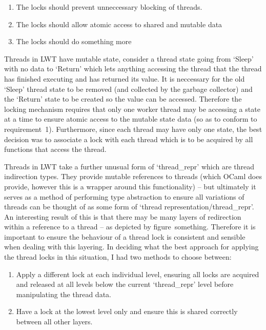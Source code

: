 \documentclass[12pt,twoside,notitlepage]{report}
\begin{document}
\begin{enumerate}
\item The locks should prevent unneccessary blocking of threads.
\item The locks should allow atomic access to shared and mutable data
\item The locks should do something more
\end{enumerate}
%
%
Threads in LWT have mutable state, consider a thread state going from `Sleep' with no data to `Return' which lets anything accessing the thread that the thread has finished executing and has returned its value. It is neccessary for
the old `Sleep' thread state to be removed (and collected by the garbage collector) and the `Return' state to be created so the value can be accessed. Therefore the locking mechanism requires that only one worker thread may be
accessing a state at a time to ensure atomic access to the mutable state data (so as to conform to requirement~1). Furthermore, since each thread may have only one state, the best decision was to associate a lock with each thread
which is to be acquired by all functions that access the thread. 

%
%
Threads in LWT take a further unusual form of `thread\_repr' which are thread indirection types. They provide mutable references to threads (which OCaml does provide, however this is a wrapper around this functionality) -- but
ultimately it serves as a method of performing type abstraction to ensure all variations of threads can be thought of as some form of `thread representation/thread\_repr'. An interesting result of this is that there may be many layers
of redirection within a reference to a thread -- as depicted by figure~something. Therefore it is important to ensure the behaviour of a thread lock is consistent and sensible when dealing
with this layering. In deciding what the best approach for applying the thread locks in this situation, I had two methods to choose between:

\begin{enumerate}
\item Apply a different lock at each individual level, ensuring all locks are acquired and released at all levels below the current `thread\_repr' level before manipulating the thread data.
\item Have a lock at the lowest level only and ensure this is shared correctly between all other layers.
\end{enumerate}
\end{document}
